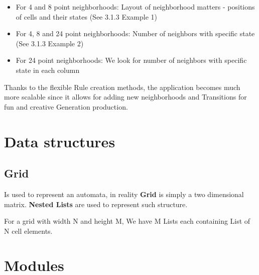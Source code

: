 \documentclass{article}
\begin{document}
\begin{itemize}
	\item For 4 and 8 point neighborhoods:
		Layout of neighborhood matters - positions of cells and their states
		(See 3.1.3 Example 1)
	\item For 4, 8 and 24 point neighborhoods:
		Number of neighbors with specific state 
		(See 3.1.3 Example 2)
	\item For 24 point neighborhoods:
		We look for number of neighbors with specific state in each column
\end{itemize}

Thanks to the flexible Rule creation methods, the application becomes much more scalable since
it allows for adding new neighborhoods and Transitions for fun and creative Generation production.






\section{Data structures}

\subsection{Grid}
Is used to represent an automata, in reality {\bf Grid} is simply a two dimensional matrix.
{\bf Nested Lists} are used to represent such structure.

For a grid with width N and height M,
We have M Lists each containing List of N cell elements.





\section{Modules}
\end{document}
